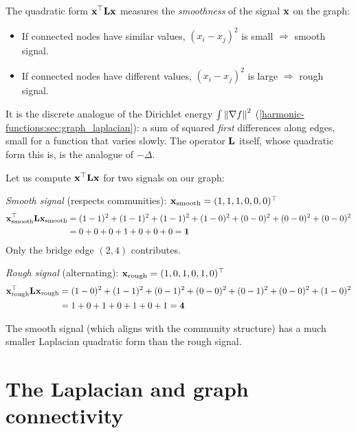 \begin{notechapter}
\begin{intuition}
The quadratic form $\mathbf{x}^\top \mathbf{L} \mathbf{x}$ measures the \emph{smoothness} of the signal $\mathbf{x}$ on the graph:
\begin{itemize}
    \item If connected nodes have similar values, $(x_i - x_j)^2$ is small $\Rightarrow$ smooth signal.
    \item If connected nodes have different values, $(x_i - x_j)^2$ is large $\Rightarrow$ rough signal.
\end{itemize}

It is the discrete analogue of the Dirichlet energy $\int\left\|\nabla f\right\|^2$ (\cref{harmonic-functions:sec:graph_laplacian}): a sum of squared \emph{first} differences
along edges, small for a function that varies slowly. The operator $\mathbf{L}$ itself, whose quadratic form this
is, is the analogue of $-\Delta$.
\end{intuition}

\begin{example}
Let us compute $\mathbf{x}^\top \mathbf{L} \mathbf{x}$ for two signals on our graph:

\emph{Smooth signal} (respects communities): $\mathbf{x}_{\text{smooth}} = (1, 1, 1, 0, 0, 0)^\top$
\begin{align}
\mathbf{x}_{\text{smooth}}^\top \mathbf{L} \mathbf{x}_{\text{smooth}} &= (1-1)^2 + (1-1)^2 + (1-1)^2 + (1-0)^2 + (0-0)^2 + (0-0)^2 + (0-0)^2 \\
&= 0 + 0 + 0 + 1 + 0 + 0 + 0 = \mathbf{1}
\end{align}
Only the bridge edge $(2,4)$ contributes.

\emph{Rough signal} (alternating): $\mathbf{x}_{\text{rough}} = (1, 0, 1, 0, 1, 0)^\top$
\begin{align}
\mathbf{x}_{\text{rough}}^\top \mathbf{L} \mathbf{x}_{\text{rough}} &= (1-0)^2 + (1-1)^2 + (0-1)^2 + (0-0)^2 + (0-1)^2 + (0-0)^2 + (1-0)^2 \\
&= 1 + 0 + 1 + 0 + 1 + 0 + 1 = \mathbf{4}
\end{align}

The smooth signal (which aligns with the community structure) has a much smaller Laplacian quadratic form than the rough signal.
\end{example}

\section{The Laplacian and graph connectivity}


\end{notechapter}
